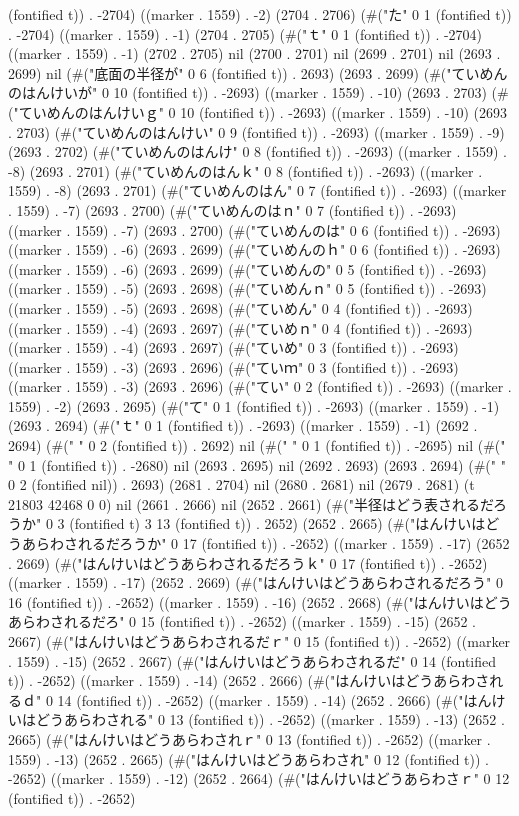 {(fontified t)) . -2704) ((marker . 1559) . -2) (2704 . 2706) (#("た" 0 1 (fontified t)) . -2704) ((marker . 1559) . -1) (2704 . 2705) (#("ｔ" 0 1 (fontified t)) . -2704) ((marker . 1559) . -1) (2702 . 2705) nil (2700 . 2701) nil (2699 . 2701) nil (2693 . 2699) nil (#("底面の半径が" 0 6 (fontified t)) . 2693) (2693 . 2699) (#("ていめんのはんけいが" 0 10 (fontified t)) . -2693) ((marker . 1559) . -10) (2693 . 2703) (#("ていめんのはんけいｇ" 0 10 (fontified t)) . -2693) ((marker . 1559) . -10) (2693 . 2703) (#("ていめんのはんけい" 0 9 (fontified t)) . -2693) ((marker . 1559) . -9) (2693 . 2702) (#("ていめんのはんけ" 0 8 (fontified t)) . -2693) ((marker . 1559) . -8) (2693 . 2701) (#("ていめんのはんｋ" 0 8 (fontified t)) . -2693) ((marker . 1559) . -8) (2693 . 2701) (#("ていめんのはん" 0 7 (fontified t)) . -2693) ((marker . 1559) . -7) (2693 . 2700) (#("ていめんのはｎ" 0 7 (fontified t)) . -2693) ((marker . 1559) . -7) (2693 . 2700) (#("ていめんのは" 0 6 (fontified t)) . -2693) ((marker . 1559) . -6) (2693 . 2699) (#("ていめんのｈ" 0 6 (fontified t)) . -2693) ((marker . 1559) . -6) (2693 . 2699) (#("ていめんの" 0 5 (fontified t)) . -2693) ((marker . 1559) . -5) (2693 . 2698) (#("ていめんｎ" 0 5 (fontified t)) . -2693) ((marker . 1559) . -5) (2693 . 2698) (#("ていめん" 0 4 (fontified t)) . -2693) ((marker . 1559) . -4) (2693 . 2697) (#("ていめｎ" 0 4 (fontified t)) . -2693) ((marker . 1559) . -4) (2693 . 2697) (#("ていめ" 0 3 (fontified t)) . -2693) ((marker . 1559) . -3) (2693 . 2696) (#("ていｍ" 0 3 (fontified t)) . -2693) ((marker . 1559) . -3) (2693 . 2696) (#("てい" 0 2 (fontified t)) . -2693) ((marker . 1559) . -2) (2693 . 2695) (#("て" 0 1 (fontified t)) . -2693) ((marker . 1559) . -1) (2693 . 2694) (#("ｔ" 0 1 (fontified t)) . -2693) ((marker . 1559) . -1) (2692 . 2694) (#("  " 0 2 (fontified t)) . 2692) nil (#(" " 0 1 (fontified t)) . -2695) nil (#("\\" 0 1 (fontified t)) . -2680) nil (2693 . 2695) nil (2692 . 2693) (2693 . 2694) (#("  " 0 2 (fontified nil)) . 2693) (2681 . 2704) nil (2680 . 2681) nil (2679 . 2681) (t 21803 42468 0 0) nil (2661 . 2666) nil (2652 . 2661) (#("半径はどう表されるだろうか" 0 3 (fontified t) 3 13 (fontified t)) . 2652) (2652 . 2665) (#("はんけいはどうあらわされるだろうか" 0 17 (fontified t)) . -2652) ((marker . 1559) . -17) (2652 . 2669) (#("はんけいはどうあらわされるだろうｋ" 0 17 (fontified t)) . -2652) ((marker . 1559) . -17) (2652 . 2669) (#("はんけいはどうあらわされるだろう" 0 16 (fontified t)) . -2652) ((marker . 1559) . -16) (2652 . 2668) (#("はんけいはどうあらわされるだろ" 0 15 (fontified t)) . -2652) ((marker . 1559) . -15) (2652 . 2667) (#("はんけいはどうあらわされるだｒ" 0 15 (fontified t)) . -2652) ((marker . 1559) . -15) (2652 . 2667) (#("はんけいはどうあらわされるだ" 0 14 (fontified t)) . -2652) ((marker . 1559) . -14) (2652 . 2666) (#("はんけいはどうあらわされるｄ" 0 14 (fontified t)) . -2652) ((marker . 1559) . -14) (2652 . 2666) (#("はんけいはどうあらわされる" 0 13 (fontified t)) . -2652) ((marker . 1559) . -13) (2652 . 2665) (#("はんけいはどうあらわされｒ" 0 13 (fontified t)) . -2652) ((marker . 1559) . -13) (2652 . 2665) (#("はんけいはどうあらわされ" 0 12 (fontified t)) . -2652) ((marker . 1559) . -12) (2652 . 2664) (#("はんけいはどうあらわさｒ" 0 12 (fontified t)) . -2652) }
